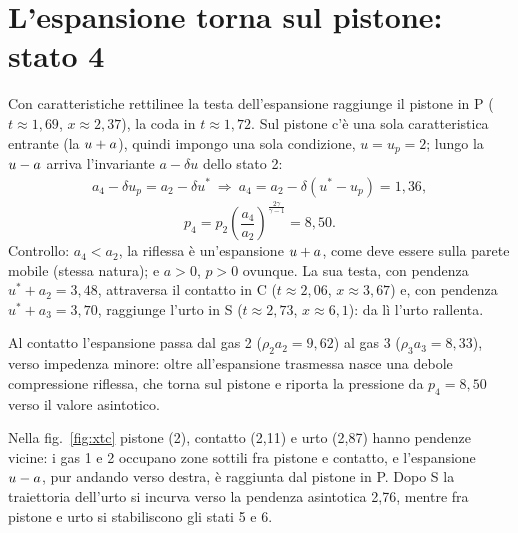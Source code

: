 \section*{L'espansione torna sul pistone: stato 4}
Con caratteristiche rettilinee la testa dell'espansione raggiunge il pistone in P ($t\approx1{,}69$, $x\approx2{,}37$),
la coda in $t\approx1{,}72$. Sul pistone c'è una sola caratteristica entrante (la $u+a$), quindi impongo una sola
condizione, $u=u_p=2$; lungo la $u-a$ arriva l'invariante $a-\delta u$ dello stato 2:
\begin{gather*}
a_4-\delta u_p=a_2-\delta u^* \ \Rightarrow\ a_4=a_2-\delta(u^*-u_p)=1{,}36,
\end{gather*}
\[
p_4=p_2\left(\frac{a_4}{a_2}\right)^{\frac{2\gamma}{\gamma-1}}=8{,}50.
\]
Controllo: $a_4<a_2$, la riflessa è un'espansione $u+a$, come deve essere sulla parete mobile (stessa natura); e
$a>0$, $p>0$ ovunque. La sua testa, con pendenza $u^*+a_2=3{,}48$, attraversa il contatto in C ($t\approx2{,}06$,
$x\approx3{,}67$) e, con pendenza $u^*+a_3=3{,}70$, raggiunge l'urto in S ($t\approx2{,}73$, $x\approx6{,}1$): da lì
l'urto rallenta.

Al contatto l'espansione passa dal gas 2 ($\rho_2a_2=9{,}62$) al gas 3 ($\rho_3a_3=8{,}33$), verso impedenza minore:
oltre all'espansione trasmessa nasce una debole compressione riflessa, che torna sul pistone e riporta la pressione
da $p_4=8{,}50$ verso il valore asintotico.


Nella fig.~\ref{fig:xtc} pistone (2), contatto (2,11) e urto (2,87) hanno pendenze vicine: i gas 1 e 2 occupano zone
sottili fra pistone e contatto, e l'espansione $u-a$, pur andando verso destra, è raggiunta dal pistone in P. Dopo S
la traiettoria dell'urto si incurva verso la pendenza asintotica 2,76, mentre fra pistone e urto si stabiliscono gli
stati 5 e 6.

